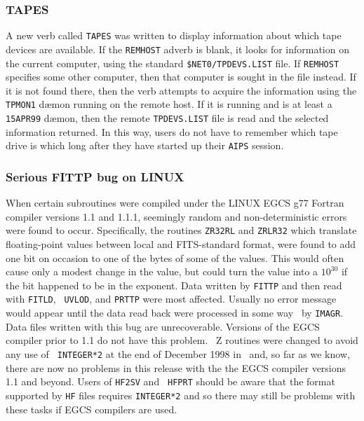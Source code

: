 \subsubsection{TAPES}

A new verb called {\tt TAPES} was written to display information about
which tape devices are available.  If the {\tt REMHOST} adverb is
blank, it looks for information on the current computer, using the
standard {\tt \$NET0/TPDEVS.LIST} file.  If {\tt REMHOST} specifies
some other computer, then that computer is sought in the file instead.
If it is not found there, then the verb attempts to acquire the
information using the {\tt TPMON1} d\ae mon running on the remote
host.  If it is running and is at least a {\tt 15APR99} d\ae mon, then
the remote {\tt TPDEVS.LIST} file is read and the selected information
returned.  In this way, users do not have to remember which tape drive
is which long after they have started up their {\tt AIPS} session.

\subsubsection{Serious FITTP bug on LINUX}

When certain subroutines were compiled under the LINUX EGCS g77 Fortran
compiler versions 1.1 and 1.1.1, seemingly random and
non-deterministic errors were found to occur.  Specifically, the
routines {\tt ZR32RL} and {\tt ZRLR32} which translate floating-point
values between local and FITS-standard format, were found to add one
bit on occasion to one of the bytes of some of the values.  This would
often cause only a modest change in the value, but could turn the
value into a $10^{30}$ if the bit happened to be in the exponent.
Data written by {\tt FITTP} and then read with {\tt FITLD}, {\tt
UVLOD}, and {\tt PRTTP} were most affected.  Usually no error message
would appear until the data read back were processed in some way
\eg\ by {\tt IMAGR}\@.  Data files written with this bug are
unrecoverable.  Versions of the EGCS compiler prior to 1.1 do not have
this problem.  \AIPS\ Z routines were changed to avoid any use of {\tt
INTEGER*2} at the end of December 1998 in \RELEASENAME\ and, so far as
we know, there are now no problems in this release with the the EGCS
compiler versions 1.1 and beyond.  Users of {\tt HF2SV} and {\tt
HFPRT} should be aware that the format supported by {\tt HF} files
requires {\tt INTEGER*2} and so there may still be problems with these
tasks if EGCS compilers are used.

